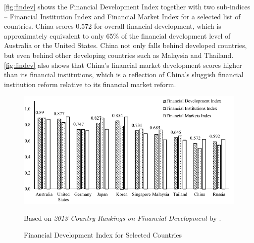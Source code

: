 \documentclass[AER]{AEA}
\begin{document}
\autoref{fig:findev} shows the Financial Development Index together with 
two sub-indices -- Financial Institution Index and Financial Market Index 
for a selected list of countries. 
China scores 0.572 for overall financial development, 
which is approximately equivalent to only 65\% of the financial development 
level of Australia or the United States. China not only falls 
behind developed countries, but even behind other developing countries such as 
Malaysia and Thailand. 
\autoref{fig:findev} also shows that China's financial market development 
scores higher than its financial institutions, which is a reflection of China's 
sluggish financial institution reform relative to its financial market reform. 

\begin{figure}[!htb]
\centering
\includegraphics[scale=1]{fig/findev.pdf}
\caption{Financial Development Index for Selected Countries}
\begin{figurenotes}[Source]
Based on \textit{2013 Country Rankings on Financial Development} by
\cite{sviry2016}.
\end{figurenotes}
\label{fig:findev}
\end{figure}


\end{document}
